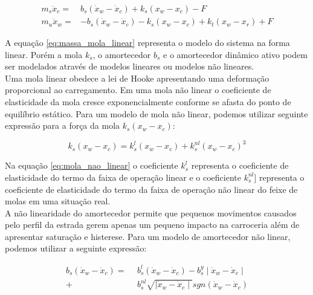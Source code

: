 \begin{equation} \label{eq:massa_mola_linear}
    \begin{split}
        m_{s} \ddot{x}_{c} =&  b_{s}(\dot{x}_{w}-\dot{x}_{c}) + k_{s}(x_{w}-x_{c}) - F\ \\
        m_{u} \ddot{x}_{w} =& -b_{s}(\dot{x}_{w}-\dot{x}_{c}) - k_{s}(x_{w}-x_{c})+k_{t}(x_{w}-x_{r}) + F
    \end{split}
\end{equation}
    
A equação \ref{eq:massa_mola_linear} representa o modelo do sistema na forma linear. Porém a mola $k_s$, o amortecedor $b_s$ e o amortecedor dinâmico ativo podem ser modelados através de modelos lineares ou modelos não lineares. \\
Uma mola linear obedece a lei de Hooke apresentando uma deformação proporcional ao carregamento. Em uma mola não linear o coeficiente de elasticidade da mola cresce exponencialmente conforme se afasta do ponto de equilíbrio estático.
Para um modelo de mola não linear, podemos utilizar seguinte expressão para a força da mola $ k_{s}(x_{w}-x_{c})$:
    
\begin{equation} \label{eq:mola_nao_linear}
    k_{s}(x_{w}-x_{c}) = k^{l}_{s}(x_{w}-x_{c})+k^{nl}_{s}(x_{w}-x_{c})^{3}
\end{equation}
        
Na equação \ref{eq:mola_nao_linear} o coeficiente $k^{l}_{s}$ representa o coeficiente de elasticidade do termo da faixa de operação linear e o coeficiente $k^{nl}_{s}$] representa o coeficiente de elasticidade do termo da faixa de operação não linear do feixe de molas em uma situação real.\\
A não linearidade do amortecedor permite que pequenos movimentos causados pelo perfil da estrada gerem apenas um pequeno impacto na carroceria além de apresentar saturação e histerese. Para um modelo de amortecedor não linear, podemos utilizar a seguinte expressão:
 
\begin{equation} \label{eq:amortecedor_nao_linear}
    \begin{aligned}
        b_{s}(\dot{x}_{w}-\dot{x}_{c}) =\ \ &b^{l}_{s}(\dot{x}_{w}-\dot{x}_{c}) - b^{y}_{s}\mid\dot{x}_{w}-\dot{x}_{c}\mid \\
        + &b^{nl}_{s}\sqrt{\mid\dot{x}_{w}-\dot{x}_{c}\mid}sgn(\dot{x}_{w}-\dot{x}_{c})  
    \end{aligned}
\end{equation}
    
